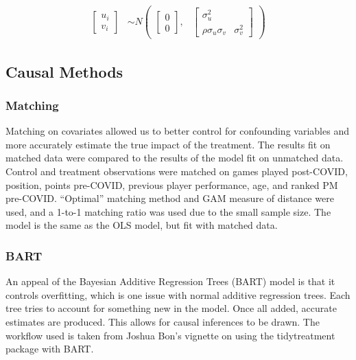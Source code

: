 \documentclass[12pt]{article}
\begin{document}
\begin{align*}
\begin{bmatrix}u_{i}\\
v_{i}
\end{bmatrix} &\sim  N
\begin{pmatrix}
\begin{bmatrix}
0\\
0
\end{bmatrix}\!\!,&
\begin{bmatrix}
\sigma_{u}^2 & \\
\rho\sigma_{u}\sigma_{v} & \sigma_{v}^2
\end{bmatrix}
\end{pmatrix}
\end{align*}

\hypertarget{causal-methods}{%
\subsection{Causal Methods}\label{causal-methods}}

\hypertarget{matching}{%
\subsubsection{Matching}\label{matching}}

Matching on covariates allowed us to better control for confounding
variables and more accurately estimate the true impact of the treatment.
The results fit on matched data were compared to the results of the
model fit on unmatched data. Control and treatment observations were
matched on games played post-COVID, position, points pre-COVID, previous
player performance, age, and ranked PM pre-COVID. ``Optimal'' matching
method and GAM measure of distance were used, and a 1-to-1 matching
ratio was used due to the small sample size. The model is the same as
the OLS model, but fit with matched data.

\hypertarget{bart}{%
\subsubsection{BART}\label{bart}}

An appeal of the Bayesian Additive Regression Trees (BART) model is that
it controls overfitting, which is one issue with normal additive
regression trees. Each tree tries to account for something new in the
model. Once all added, accurate estimates are produced. This allows for
causal inferences to be drawn. The workflow used is taken from Joshua
Bon's vignette on using the tidytreatment package with BART.
\end{document}
